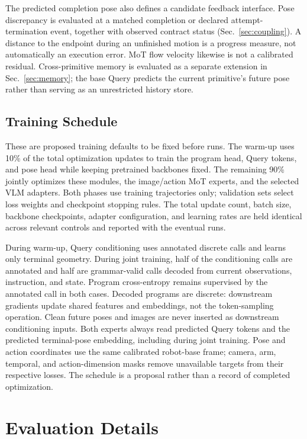 The predicted completion pose also defines a candidate feedback interface. Pose discrepancy is evaluated at a matched completion or declared attempt-termination event, together with observed contract status (Sec.~\ref{sec:coupling}). A distance to the endpoint during an unfinished motion is a progress measure, not automatically an execution error. MoT flow velocity likewise is not a calibrated residual. Cross-primitive memory is evaluated as a separate extension in Sec.~\ref{sec:memory}; the base Query predicts the current primitive's future pose rather than serving as an unrestricted history store.

\subsection{Training Schedule}
\label{app:training}
These are proposed training defaults to be fixed before runs. The warm-up uses 10\% of the total optimization updates to train the program head, Query tokens, and pose head while keeping pretrained backbones fixed. The remaining 90\% jointly optimizes these modules, the image/action MoT experts, and the selected VLM adapters. Both phases use training trajectories only; validation sets select loss weights and checkpoint stopping rules. The total update count, batch size, backbone checkpoints, adapter configuration, and learning rates are held identical across relevant controls and reported with the eventual runs.

During warm-up, Query conditioning uses annotated discrete calls and learns only terminal geometry. During joint training, half of the conditioning calls are annotated and half are grammar-valid calls decoded from current observations, instruction, and state. Program cross-entropy remains supervised by the annotated call in both cases. Decoded programs are discrete: downstream gradients update shared features and embeddings, not the token-sampling operation. Clean future poses and images are never inserted as downstream conditioning inputs. Both experts always read predicted Query tokens and the predicted terminal-pose embedding, including during joint training. Pose and action coordinates use the same calibrated robot-base frame; camera, arm, temporal, and action-dimension masks remove unavailable targets from their respective losses. The schedule is a proposal rather than a record of completed optimization.

\section{Evaluation Details}
\setcounter{equation}{0}
\label{app:experiments}
